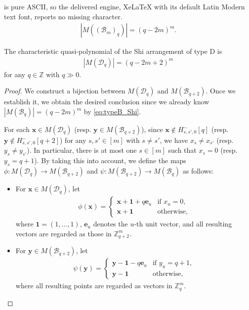 \documentclass[10pt,a4paper]{amsart}
\newcommand{\Bc}{\mathcal{B}}
\newcommand{\Dc}{\mathcal{D}}
\newcommand{\ZZ}{\mathbb{Z}}
\begin{document}
is pure ASCII, so the delivered engine, XeLaTeX with its default Latin Modern text font, reports no missing character.
\begin{align}\label{eq:typeB_Shi}
\left| M((\Bc_m)_q)\right| = (q-2m)^m. 
\end{align}

\begin{Them}\label{thm-chara-quasi-TypeD}
    The characteristic quasi-polynomial of the Shi arrangement of type D is 
\begin{align*}
\left|M(\Dc_q)\right|=(q-2m+2)^m
\end{align*}
for any $q\in\mathbb{Z}$ with $q\gg 0$.
\end{Them}

\begin{proof}
We construct a bijection between $M(\Dc_q)$ and $M(\Bc_{q+2})$. 
Once we establish it, we obtain the desired conclusion since we already know $\left|M(\Bc_q)\right|=(q-2m)^m$ by \eqref{eq:typeB_Shi}.  



\medskip

For each $\bm{x} \in M(\Dc_q)$ (resp. $\bm{y} \in M(\Bc_{q+2})$), since $\bm{x} \not\in H_{s,s',0}^-[q]$ (resp. $\bm{y} \not\in H_{s,s',0}^-[q+2]$) for any $s,s' \in [m]$ with $s \neq s'$, we have $x_s \neq x_{s'}$ (resp. $y_s \neq y_{s'}$). 
In particular, there is at most one $s \in [m]$ such that $x_s=0$ (resp. $y_s=q+1$). 
By taking this into account, we define the maps $\phi : M(\Dc_q) \to M(\Bc_{q+2})$ and $\psi : M(\Bc_{q+2}) \to M(\Bc_q)$ as follows:
\begin{itemize}
    \item For $\bm{x} \in M(\Dc_q)$, let
    \begin{align*}
        \phi(\bm{x})=
        \begin{cases}
            \bm{x} + \bm{1} + q\bm{e}_u &\text{if $x_u = 0$}, \\
            \bm{x} + \bm{1} &\text{otherwise}, 
        \end{cases}
    \end{align*}
    where $\bm{1} = (1, \ldots, 1)$, $\bm{e}_u$ denotes the $u$-th unit vector, and all resulting vectors are regarded as those in $\ZZ_{q+2}^m$. 
\end{itemize}
\begin{itemize}
    \item For $\bm{y} \in M(\Bc_{q+2})$, let
    \begin{align*}
        \psi(\bm{y})=
        \begin{cases}
            \bm{y} - \bm{1} - q\bm{e}_u &\text{if $y_u = q+1$}, \\
            \bm{y} - \bm{1} &\text{otherwise}, 
        \end{cases}
    \end{align*}
where all resulting points are regarded as vectors in $\ZZ_q^m$. 
\end{itemize}



\end{proof}
\end{document}
